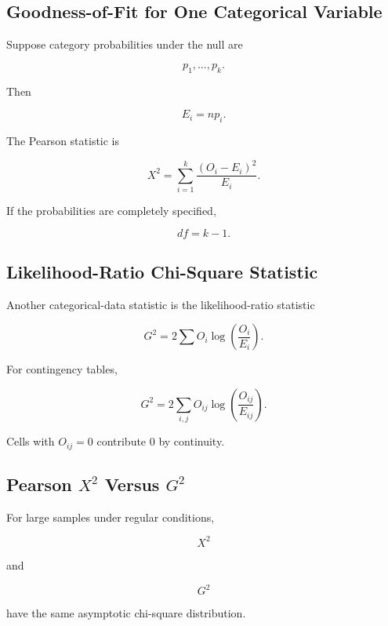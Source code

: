 \subsection{Goodness-of-Fit for One Categorical Variable}
\label{subsec:categorical-goodness-fit}

Suppose category probabilities under the null are

\[
p_1,\ldots,p_k.
\]

Then

\[
\boxed{
E_i
=
np_i.
}
\]

The Pearson statistic is

\[
\boxed{
X^2
=
\sum_{i=1}^{k}
\frac{
(O_i-E_i)^2
}{
E_i
}.
}
\]

If the probabilities are completely specified,

\[
\boxed{
df=k-1.
}
\]

\subsection{Likelihood-Ratio Chi-Square Statistic}
\label{subsec:likelihood-ratio-chi-square}

Another categorical-data statistic is the likelihood-ratio statistic

\[
\boxed{
G^2
=
2
\sum
O_i
\log
\left(
\frac{
O_i
}{
E_i
}
\right).
}
\]

For contingency tables,

\[
\boxed{
G^2
=
2
\sum_{i,j}
O_{ij}
\log
\left(
\frac{
O_{ij}
}{
E_{ij}
}
\right).
}
\]

Cells with \(O_{ij}=0\) contribute \(0\) by continuity.

\subsection{Pearson \(X^2\) Versus \(G^2\)}
\label{subsec:pearson-versus-likelihood-ratio}

For large samples under regular conditions,

\[
\boxed{
X^2
}
\]

and

\[
\boxed{
G^2
}
\]

have the same asymptotic chi-square distribution.

